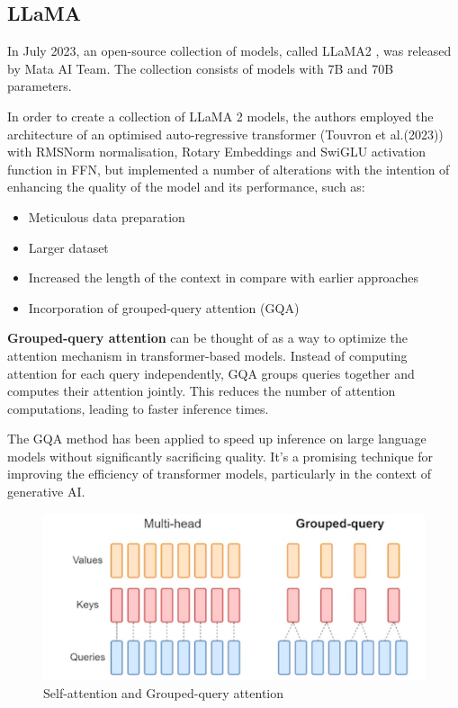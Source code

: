 \documentclass[PMI,VKR]{HSEUniversity}
\begin{document}
\subsection{LLaMA}

In July 2023, an open-source collection of models, called LLaMA2 \cite{llama:2023}, was released by Mata AI Team. The collection consists of models with 7B and 70B parameters.

In order to create a collection of LLaMA 2 models, the authors employed the architecture of an optimised auto-regressive transformer (Touvron et al.(2023)) with RMSNorm normalisation, Rotary Embeddings and SwiGLU activation function in FFN, but implemented a number of alterations with the intention of enhancing the quality of the model and its performance, such as:
\begin{itemize}
    \item Meticulous data preparation
    \item Larger dataset
    \item Increased the length of the context in compare with earlier approaches
    \item Incorporation of grouped-query attention (GQA)
\end{itemize}   

\textbf{Grouped-query attention} can be thought of as a way to optimize the attention mechanism in transformer-based models. 
Instead of computing attention for each query independently, GQA groups queries together and computes their attention jointly. This reduces the number of attention computations, leading to faster inference times.

The GQA method has been applied to speed up inference on large language models without significantly sacrificing quality. 
It's a promising technique for improving the efficiency of transformer models, particularly in the context of generative AI.

\begin{figure}[h]
    \centering
    \includegraphics[scale=1]{img/gqa.png}
    \caption{Self-attention and Grouped-query attention}
\end{figure}
\end{document}
